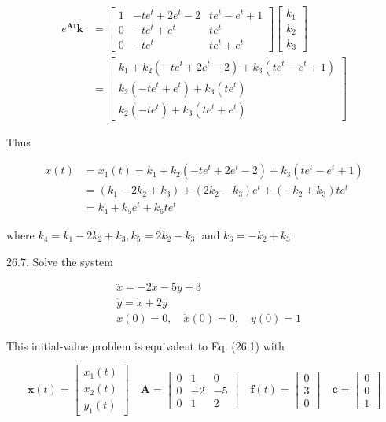\documentclass[10pt]{article}
\begin{document}
$$
\begin{aligned}
e^{\mathbf{A} t} \mathbf{k} & =\left[\begin{array}{ccc}
1 & -t e^{t}+2 e^{t}-2 & t e^{t}-e^{t}+1 \\
0 & -t e^{t}+e^{t} & t e^{t} \\
0 & -t e^{t} & t e^{t}+e^{t}
\end{array}\right]\left[\begin{array}{l}
k_{1} \\
k_{2} \\
k_{3}
\end{array}\right] \\
& =\left[\begin{array}{c}
k_{1}+k_{2}\left(-t e^{t}+2 e^{t}-2\right)+k_{3}\left(t e^{t}-e^{t}+1\right) \\
k_{2}\left(-t e^{t}+e^{t}\right)+k_{3}\left(t e^{t}\right) \\
k_{2}\left(-t e^{t}\right)+k_{3}\left(t e^{t}+e^{t}\right)
\end{array}\right]
\end{aligned}
$$

Thus

$$
\begin{aligned}
x(t) & =x_{1}(t)=k_{1}+k_{2}\left(-t e^{t}+2 e^{t}-2\right)+k_{3}\left(t e^{t}-e^{t}+1\right) \\
& =\left(k_{1}-2 k_{2}+k_{3}\right)+\left(2 k_{2}-k_{3}\right) e^{t}+\left(-k_{2}+k_{3}\right) t e^{t} \\
& =k_{4}+k_{5} e^{t}+k_{6} t e^{t}
\end{aligned}
$$

where $k_{4}=k_{1}-2 k_{2}+k_{3}, k_{5}=2 k_{2}-k_{3}$, and $k_{6}=-k_{2}+k_{3}$.

26.7. Solve the system

$$
\begin{aligned}
& \ddot{x}=-2 \dot{x}-5 y+3 \\
& \dot{y}=\dot{x}+2 y \\
& x(0)=0, \quad \dot{x}(0)=0, \quad y(0)=1
\end{aligned}
$$

This initial-value problem is equivalent to Eq. (26.1) with

$$
\mathbf{x}(t)=\left[\begin{array}{l}
x_{1}(t) \\
x_{2}(t) \\
y_{1}(t)
\end{array}\right] \quad \mathbf{A}=\left[\begin{array}{rrr}
0 & 1 & 0 \\
0 & -2 & -5 \\
0 & 1 & 2
\end{array}\right] \quad \mathbf{f}(t)=\left[\begin{array}{l}
0 \\
3 \\
0
\end{array}\right] \quad \mathbf{c}=\left[\begin{array}{l}
0 \\
0 \\
1
\end{array}\right]
$$
\end{document}
